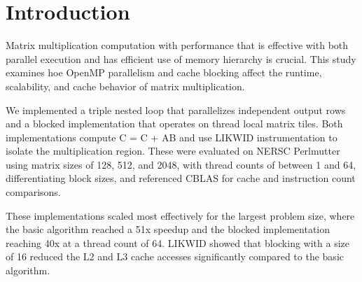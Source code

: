 \section{Introduction}

Matrix multiplication computation with performance that is effective with both parallel execution and has efficient use of memory hierarchy is crucial. This study examines hoe OpenMP parallelism and cache blocking affect the runtime, scalability, and cache behavior of matrix multiplication.

We implemented a triple nested loop that parallelizes independent output rows and a blocked implementation that operates on thread local matrix tiles. Both implementations compute C = C + AB and use LIKWID instrumentation to isolate the multiplication region. These were evaluated on NERSC Perlmutter using matrix sizes of 128, 512, and 2048, with thread counts of between 1 and 64, differentiating block sizes, and referenced CBLAS for cache and instruction count comparisons.

These implementations scaled most effectively for the largest problem size, where the basic algorithm reached a 51x speedup and the blocked implementation reaching 40x at a thread count of 64. LIKWID showed that blocking with a size of 16 reduced the L2 and L3 cache accesses significantly compared to the basic algorithm. 

